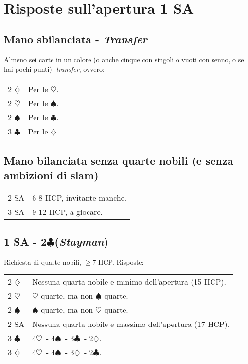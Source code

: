 \documentclass[a4paper,10pt]{article}
\renewcommand{\c}{$\clubsuit$\xspace}
\renewcommand{\d}{$\diamondsuit$\xspace}
\newcommand{\h}{$\heartsuit$\xspace}
\newcommand{\s}{$\spadesuit$\xspace}
\newcommand{\sa}{SA\xspace}
\begin{document}
\section{Risposte sull'apertura 1 SA}

\subsection{Mano sbilanciata - \textit{Transfer}}

Almeno sei carte in un colore (o anche cinque con singoli o vuoti con senno, o se hai pochi punti), \textit{transfer}, ovvero:

\begin{tabular}{p{} p{}}
 2 \d & Per le \h.\\
 2 \h & Per le \s.\\
 2 \s & Per le \c.\\
 3 \c & Per le \d.\\
\end{tabular}

\subsection{Mano bilanciata senza quarte nobili (e senza ambizioni di slam)}

\begin{tabular}{p{} p{}}
 2 \sa & 6-8 HCP, invitante manche.\\
 3 \sa & 9-12 HCP, a giocare.
\end{tabular}


\subsection{1 SA - 2\c (\textit{Stayman})}

Richiesta di quarte nobili, $\geq 7$ HCP. Risposte:\\
\begin{tabular}{p{} p{}}
 2 \d & Nessuna quarta nobile e minimo dell'apertura (15 HCP).\\
 2 \h & \h quarte, ma non \s quarte.\\
 2 \s & \s quarte, ma non \h quarte.\\
 2 SA & Nessuna quarta nobile e massimo dell'apertura (17 HCP).\\
 3 \c & 4\h\ - 4\s\ - 3\c\ - 2\d.\\
 3 \d & 4\h\ - 4\s\ - 3\d\ - 2\c.\\
\end{tabular}
\end{document}

